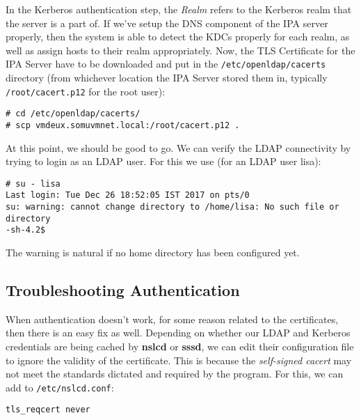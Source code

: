 In the Kerberos authentication step, the \textit{Realm} refers to the Kerberos realm that the server is a part of. If we've setup the DNS component of the IPA server properly, then the system is able to detect the KDCs properly for each realm, as well as assign hosts to their realm appropriately. Now, the TLS Certificate for the IPA Server have to be downloaded and put in the \verb|/etc/openldap/cacerts| directory (from whichever location the IPA Server stored them in, typically \verb|/root/cacert.p12| for the root user):

\vspace{-15pt}
\begin{verbatim}
# cd /etc/openldap/cacerts/
# scp vmdeux.somuvmnet.local:/root/cacert.p12 .
\end{verbatim}
\vspace{-10pt}

\noindent
At this point, we should be good to go. We can verify the LDAP connectivity by trying to login as an LDAP user. For this we use (for an LDAP user lisa):

\vspace{-15pt}
\begin{verbatim}
# su - lisa
Last login: Tue Dec 26 18:52:05 IST 2017 on pts/0
su: warning: cannot change directory to /home/lisa: No such file or directory
-sh-4.2$ 
\end{verbatim}
\vspace{-10pt}

\noindent
The warning is natural if no home directory has been configured yet. 

\subsection{Troubleshooting Authentication}
When authentication doesn't work, for some reason related to the certificates, then there is an easy fix as well. Depending on whether our LDAP and Kerberos credentials are being cached by \textbf{nslcd} or \textbf{sssd}, we can edit their configuration file to ignore the validity of the certificate. This is because the \textit{self-signed cacert} may not meet the standards dictated and required by the program. For this, we can add to \verb|/etc/nslcd.conf|:

\vspace{-15pt}
\begin{verbatim}
tls_reqcert never
\end{verbatim}
\vspace{-10pt}

